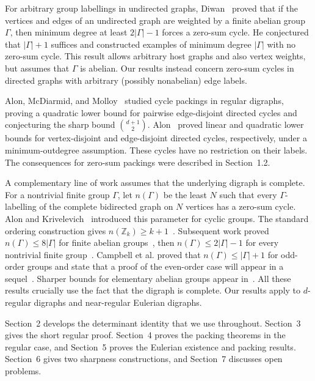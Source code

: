 \documentclass[11pt]{amsart}
\theoremstyle{remark}
\begin{document}
For arbitrary group labellings in undirected graphs, Diwan~\cite{Diwan} proved that if the vertices and edges of an
undirected graph are weighted by a finite abelian group $\Gamma$, then
minimum degree at least $2|\Gamma|-1$ forces a zero-sum cycle.  He
conjectured that $|\Gamma|+1$ suffices and constructed examples of
minimum degree $|\Gamma|$ with no zero-sum cycle.  This result allows
arbitrary host graphs and also vertex weights, but assumes that
$\Gamma$ is abelian.  Our results instead concern zero-sum cycles in
directed graphs with arbitrary (possibly nonabelian) edge labels.

Alon, McDiarmid, and Molloy~\cite{AlonMcDiarmidMolloy} studied cycle
packings in regular digraphs, proving a quadratic lower bound for
pairwise edge-disjoint directed cycles and conjecturing the sharp bound
$\binom{d+1}{2}$.  Alon~\cite{AlonDisjoint} proved linear and quadratic
lower bounds for vertex-disjoint and edge-disjoint directed cycles,
respectively, under a minimum-outdegree assumption.  These cycles have
no restriction on their labels.  The consequences for zero-sum
packings were described in Section~1.2.

A complementary line of work assumes that the underlying digraph is complete.
For a nontrivial finite group $\Gamma$, let $n(\Gamma)$ be the least
$N$ such that every $\Gamma$-labelling of the complete bidirected graph
on $N$ vertices has a zero-sum cycle.  Alon and
Krivelevich~\cite{AlonKrivelevich} introduced this parameter for cyclic
groups.  The standard ordering construction gives
$n(\mathbb Z_k)\ge k+1$~\cite{MeszarosSteiner,Diwan}.  Subsequent work
proved $n(\Gamma)\le8|\Gamma|$ for finite
abelian groups~\cite{MeszarosSteiner}, then
$n(\Gamma)\le2|\Gamma|-1$ for every nontrivial finite
group~\cite{BerendsohnBoyadzhiyskaKozma,AkramiEtAl}.  Campbell et al.
proved that $n(\Gamma)\le|\Gamma|+1$ for odd-order groups and state that
a proof of the even-order case will appear in a
sequel~\cite{CampbellEtAl}.  Sharper bounds for
elementary abelian groups
appear in~\cite{LetzterMorrison,ChristophEtAl}.  All these results
crucially use the fact that the digraph is complete.  Our results apply
to $d$-regular digraphs and near-regular Eulerian digraphs.

Section~2 develops the determinant identity that we use throughout.
Section~3 gives the short regular proof.  Section~4 proves the packing
theorems in the regular case, and Section~5 proves the Eulerian
existence and packing results.  Section~6 gives two sharpness
constructions, and Section~7 discusses open problems.
\end{document}
